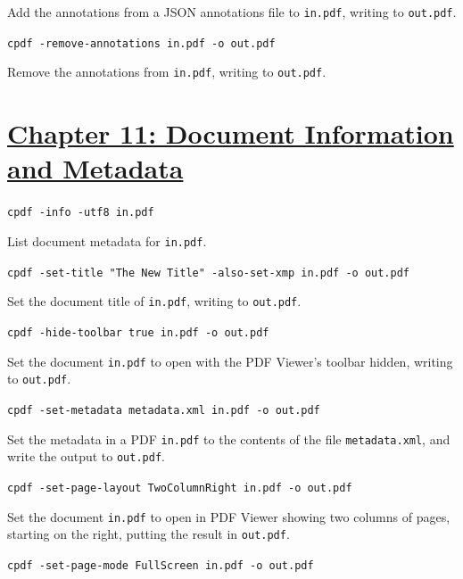 \documentclass{book}
\begin{document}
\noindent Add the annotations from a JSON annotations file to \texttt{in.pdf}, writing to \texttt{out.pdf}.

\begin{framed}\noindent\texttt{cpdf -remove-annotations in.pdf -o out.pdf}\end{framed}

\noindent Remove the annotations from \texttt{in.pdf}, writing to \texttt{out.pdf}.

\section*{\hyperref[chap:11]{Chapter 11: Document Information and Metadata}}

\begin{framed}\noindent\texttt{cpdf -info -utf8 in.pdf}\end{framed}

\noindent List document metadata for  \texttt{in.pdf}.

\begin{framed}\noindent\texttt{cpdf -set-title "The New Title" -also-set-xmp in.pdf -o out.pdf}\end{framed}

\noindent Set the document title of \texttt{in.pdf}, writing to \texttt{out.pdf}.

\begin{framed}\noindent\texttt{cpdf -hide-toolbar true in.pdf -o out.pdf}\end{framed}

\noindent Set the document \texttt{in.pdf} to open with the PDF Viewer's toolbar hidden, writing to \texttt{out.pdf}.

\begin{framed}\noindent\texttt{cpdf -set-metadata metadata.xml in.pdf -o out.pdf}\end{framed}

\noindent Set the metadata in a PDF \texttt{in.pdf} to the contents of the file \texttt{metadata.xml}, and write the output to \texttt{out.pdf}.

\begin{framed}\noindent\texttt{cpdf -set-page-layout TwoColumnRight in.pdf -o out.pdf}\end{framed}

\noindent Set the document \texttt{in.pdf} to open in PDF Viewer showing two columns of pages, starting on the right, putting the result in \texttt{out.pdf}.

\begin{framed}\noindent\texttt{cpdf -set-page-mode FullScreen in.pdf -o out.pdf}\end{framed}
\end{document}
